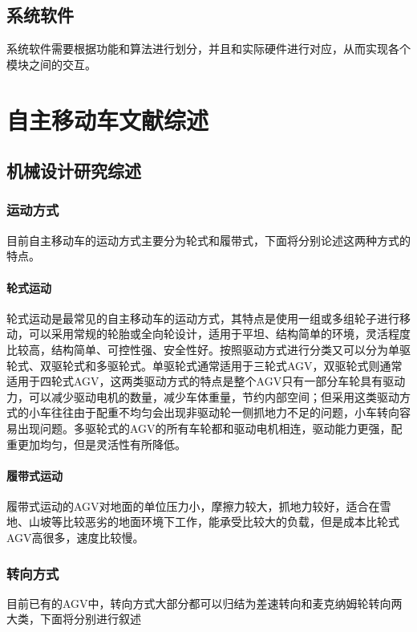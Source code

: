 \documentclass{report}
\begin{document}
\section{系统软件}
\label{sec:label}
系统软件需要根据功能和算法进行划分，并且和实际硬件进行对应，从而实现各个模块之间的交互。


\chapter{自主移动车文献综述}
\label{sec:label}


\section{机械设计研究综述}
\subsection{运动方式}
\label{subsec:label}
目前自主移动车的运动方式主要分为轮式和履带式，下面将分别论述这两种方式的特点。
\subsubsection{轮式运动}
\label{subsec:label}
轮式运动是最常见的自主移动车的运动方式，其特点是使用一组或多组轮子进行移动，可以采用常规的轮胎或全向轮设计，适用于平坦、结构简单的环境，灵活程度比较高，结构简单、可控性强、安全性好。按照驱动方式进行分类又可以分为单驱轮式、双驱轮式和多驱轮式。单驱轮式通常适用于三轮式AGV，双驱轮式则通常适用于四轮式AGV，这两类驱动方式的特点是整个AGV只有一部分车轮具有驱动力，可以减少驱动电机的数量，减少车体重量，节约内部空间；但采用这类驱动方式的小车往往由于配重不均匀会出现非驱动轮一侧抓地力不足的问题，小车转向容易出现问题。多驱轮式的AGV的所有车轮都和驱动电机相连，驱动能力更强，配重更加均匀，但是灵活性有所降低。
\subsubsection{履带式运动}
\label{subsec:label}
履带式运动的AGV对地面的单位压力小，摩擦力较大，抓地力较好，适合在雪地、山坡等比较恶劣的地面环境下工作，能承受比较大的负载，但是成本比轮式AGV高很多，速度比较慢。
\subsection{转向方式}
\label{subsec:label}
目前已有的AGV中，转向方式大部分都可以归结为差速转向和麦克纳姆轮转向两大类，下面将分别进行叙述
\end{document}
